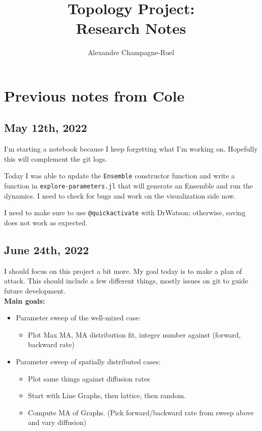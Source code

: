 \documentclass[11pt]{article}
\title{\vspace{10em} \Huge Topology Project:\\ Research Notes\vspace{2em}}
\author{\LARGE Alexandre Champagne-Ruel\vspace*{1em}}
\begin{document}
\maketitle
\clearpage

\tableofcontents
\clearpage

\section{Previous notes from Cole}
\label{sec:previous-notes}

\subsection{May 12th, 2022}

I'm starting a notebook because I keep forgetting what I'm working on. Hopefully this will complement the git logs.

Today I was able to update the \texttt{Ensemble} constructor function and write a function in \texttt{explore-parameters.jl} that will generate an Ensemble and run the dynamics. I need to check for bugs and work on the visualization side now.

I need to make sure to use \texttt{@quickactivate} with DrWatson; otherwise, saving does not work as expected.

\subsection{June 24th, 2022}

I should focus on this project a bit more. My goal today is to make a plan of attack. This should include a few different things, mostly issues on git to guide future development.\\

\textbf{Main goals:}

\begin{itemize}
    \item Parameter sweep of the well-mixed case:
    \begin{itemize}
        \item Plot Max MA, MA distribution fit, integer number against (forward, backward rate)
    \end{itemize}

    \item Parameter sweep of spatially distributed cases:
    \begin{itemize}
        \item Plot same things against diffusion rates
        \item Start with Line Graphs, then lattice, then random.
        \item Compute MA of Graphs. (Pick forward/backward rate from sweep above and vary diffusion)
    \end{itemize}
\end{itemize}
\end{document}

